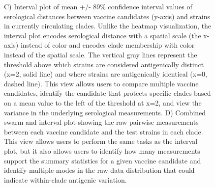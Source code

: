 \documentclass[utf8]{FrontiersinHarvard} %
\begin{document}
\begin{figure}[h!]
{C) Interval plot of mean +/- 89\% confidence interval values of serological distances between vaccine candidates (y-axis) and strains in currently circulating clades.
Unlike the heatmap visualization, the interval plot encodes serological distance with a spatial scale (the x-axis) instead of color and encodes clade membership with color instead of the spatial scale.
The vertical gray lines represent the threshold above which strains are considered antigenically distinct (x=2, solid line) and where strains are antigenically identical (x=0, dashed line).
This view allows users to compare multiple vaccine candidates, identify the candidate that protects specific clades based on a mean value to the left of the threshold at x=2, and view the variance in the underlying serological measurements.
D) Combined swarm and interval plot showing the raw pairwise measurements between each vaccine candidate and the test strains in each clade.
This view allows users to perform the same tasks as the interval plot, but it also allows users to identify how many measurements support the summary statistics for a given vaccine candidate and identify multiple modes in the raw data distribution that could indicate within-clade antigenic variation.
}\label{fig:1}
\end{figure}
\end{document}
